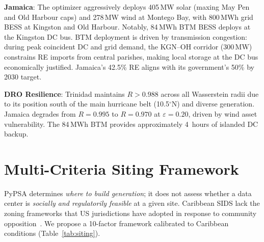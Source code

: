 \documentclass[conference,10pt]{IEEEtran}
\begin{document}
\textbf{Jamaica}: The optimizer aggressively deploys 405\,MW solar (maxing May Pen and Old Harbour caps) and 278\,MW wind at Montego Bay, with 800\,MWh grid BESS at Kingston and Old Harbour. Notably, 84\,MWh BTM BESS deploys at the Kingston DC bus. BTM deployment is driven by transmission congestion: during peak coincident DC and grid demand, the KGN--OH corridor (300\,MW) constrains RE imports from central parishes, making local storage at the DC bus economically justified. Jamaica's 42.5\% RE aligns with its government's 50\% by 2030 target.

\textbf{DRO Resilience}: Trinidad maintains $R > 0.988$ across all Wasserstein radii due to its position south of the main hurricane belt (10.5$^\circ$N) and diverse generation. Jamaica degrades from $R = 0.995$ to $R = 0.970$ at $\varepsilon = 0.20$, driven by wind asset vulnerability. The 84\,MWh BTM provides approximately 4~hours of islanded DC backup.

\section{Multi-Criteria Siting Framework}

PyPSA determines \emph{where to build generation}; it does not assess whether a data center is \emph{socially and regulatorily feasible} at a given site. Caribbean SIDS lack the zoning frameworks that US jurisdictions have adopted in response to community opposition~\cite{dcwatch2025,stafford2025,albemarle2025,ramboll2024}. We propose a 10-factor framework calibrated to Caribbean conditions (Table~\ref{tab:siting}).
\end{document}
